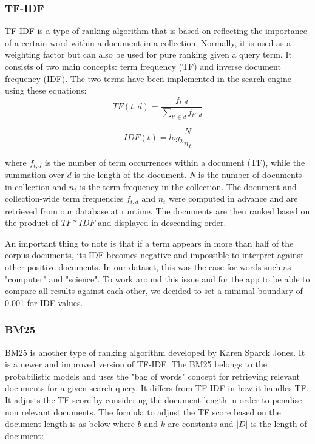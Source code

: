 \subsubsection{TF-IDF} %
\label{sub:tf_idf}

TF-IDF is a type of ranking algorithm that is based on reflecting the importance of a certain word within a document in a collection. Normally, it is used as a weighting factor but can also be used for pure ranking given a query term. It consists of two main concepts:  term frequency (TF) and inverse document frequency (IDF). The two terms have been implemented in the search engine using these equations:
$$TF(t,d) = \frac{f_{t,d}}{\sum\limits_{t' \in d} f_{t',d}}$$

$$IDF(t) = log_2 \frac{N}{n_t}$$

where $f_{t,d}$ is the number of term occurrences within a document (TF), while the summation over $d$ is the length of the document. \emph{N} is the number of documents in collection and $n_t$ is the term frequency in the collection. The document and collection-wide term frequencies $f_{t,d}$ and $n_t$ were computed in advance and are retrieved from our database at runtime. The documents are then ranked based on the product of $TF * IDF$ and displayed in descending order.

An important thing to note is that if a term appears in more than half of the corpus documents, its IDF becomes negative and impossible to interpret against other positive documents. In our dataset, this was the case for words such as "computer" and "science". To work around this issue and for the app to be able to compare all results against each other, we decided to set a minimal boundary of 0.001 for IDF values.


\subsubsection{BM25} %
\label{ssub:BM25}

BM25 is another type of ranking algorithm developed by Karen Sparck Jones. It is a newer and improved version of TF-IDF. The BM25 belongs to the probabilistic models and uses the "bag of words" concept for retrieving relevant documents for a given search query. It differs from TF-IDF in how it handles TF. It adjusts the TF score by considering the document length in order to penalise non relevant documents. The formula to adjust the TF score based on the document length is as below where $b$ and $k$ are constants and $|D|$ is the length of document:

